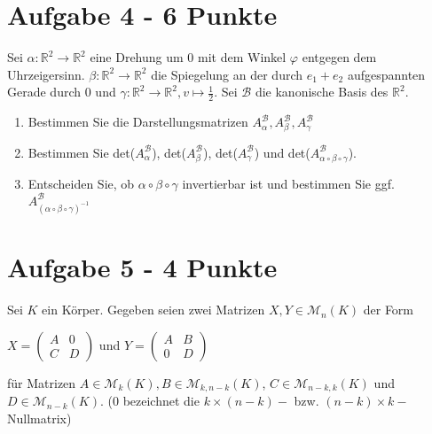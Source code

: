 \section*{Aufgabe 4 - 6 Punkte}
Sei $\alpha: \mathbb{R}^2 \rightarrow \mathbb{R}^2$ eine Drehung um 0 mit dem Winkel $\varphi$ entgegen dem Uhrzeigersinn. $\beta: \mathbb{R}^2 \rightarrow \mathbb{R}^2$ die Spiegelung an der durch $e_1 + e_2$ aufgespannten Gerade durch $0$ und $\gamma: \mathbb{R}^2 \rightarrow \mathbb{R}^2, v \mapsto \frac{1}{2}$. Sei $\mathcal{B}$ die kanonische Basis des $\mathbb{R}^2$.

\begin{enumerate}[label=\alph*)]
\item Bestimmen Sie die Darstellungsmatrizen $A_{\alpha}^{\mathcal{B}},A_{\beta}^{\mathcal{B}},A_{\gamma}^{\mathcal{B}}$
\item Bestimmen Sie det($A_{\alpha}^{\mathcal{B}}$), det($A_{\beta}^{\mathcal{B}}$), det($A_{\gamma}^{\mathcal{B}}$) und det($A_{\alpha \circ \beta \circ \gamma}^{\mathcal{B}}$).
\item Entscheiden Sie, ob $\alpha \circ \beta \circ \gamma$ invertierbar ist und bestimmen Sie ggf. $A_{(\alpha \circ \beta \circ \gamma)^{-1}}^{\mathcal{B}}$
\end{enumerate}

 
 \section*{Aufgabe 5 - 4 Punkte}
 Sei $K$ ein Körper. Gegeben seien zwei Matrizen $X,Y \in \mathcal{M}_n(K)$ der Form
 \begin{center}
 $X = \begin{pmatrix}  A&0 \\ C&D  \end{pmatrix}$ und $Y = \begin{pmatrix}  A&B \\ 0&D  \end{pmatrix}$
 \end{center}
 für Matrizen $A \in \mathcal{M}_k(K), B \in \mathcal{M}_{k,n-k}(K)$, $C \in \mathcal{M}_{n-k,k}(K)$ und $D \in \mathcal{M}_{n-k}(K)$. (0 bezeichnet die $k \times (n-k)-$ bzw. $(n-k) \times k-$ Nullmatrix)
 

